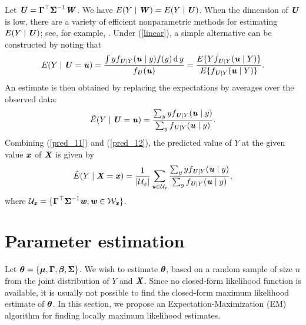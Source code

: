 \documentclass[12pt]{article}
\def \bfitu{\mbox{\textbf{\textit{u}}}}
\def \bfitw{\mbox{\textbf{\textit{w}}}}
\def \bfitx{\mbox{\textbf{\textit{x}}}}
\def \sbfitu{\mbox{\scriptsize\textbf{\textit{u}}}}
\def \sbfitx{\mbox{\scriptsize\textbf{\textit{x}}}}
\def \tbfitx{\mbox{\tiny\textbf{\textit{x}}}}
\def \bfitU{\mbox{\textbf{\textit{U}}}}
\def \sbfitU{\mbox{\scriptsize\textbf{\textit{U}}}}
\def \bfitW{\mbox{\textbf{\textit{W}}}}
\def \sbfitW{\mbox{\scriptsize\textbf{\textit{W}}}}
\def \bfitX{\mbox{\textbf{\textit{X}}}}
\def \bfbeta{\mbox{\boldmath $\beta$}}
\def \bfmu{\mbox{\boldmath $\mu$}}
\def \bftheta{\mbox{\boldmath $\theta$}}
\def \bfGamma{\mbox{\boldmath $\Gamma$}}
\def \bfSigma{\mbox{\boldmath $\Sigma$}}
\def \sbfGamma{\mbox{\scriptsize \boldmath $\Gamma$}}
\begin{document}
Let $\bfitU = \bfGamma^{\top}\bfSigma^{-1} \bfitW$. We have $E(Y \mid \bfitW) = E(Y \mid \bfitU)$. When the dimension of $\bfitU$ is low, there are a variety of efficient nonparametric methods for estimating $E(Y \mid \bfitU)$; see, for example, \citet{hardle1990applied}. Under (\ref{linear}), a simple alternative can be constructed by noting that
\begin{eqnarray*}
E(Y \mid \bfitU = \bfitu) %
= \frac{\int  y f_{\sbfitU \mid Y}(\bfitu \mid y) f(y) \operatorname{d} y}{f_{\sbfitU}(\bfitu)}
= \frac{E\{Y f_{\sbfitU \mid Y}(\bfitu \mid Y)\}}{E\{f_{\sbfitU \mid Y}(\bfitu \mid Y)\}}.
\end{eqnarray*}
An estimate is then obtained by replacing the expectations by averages over the observed data:
\begin{eqnarray}\label{pred_12}
\tilde{E}(Y \mid \bfitU = \bfitu) = \frac{\sum_{y} y f_{\sbfitU \mid Y}(\bfitu \mid y)}{\sum_y f_{\sbfitU \mid Y}(\bfitu \mid y)}.
\end{eqnarray}
Combining (\ref{pred_11}) and (\ref{pred_12}), the predicted value of $Y$ at the given value $\bfitx$ of $\bfitX$ is given by
\begin{eqnarray}\label{pred_1}
\hat{E}(Y \mid \bfitX = \bfitx) = \frac{1}{|\mathcal{U}_{\sbfitx}|}\sum_{\sbfitu \in \mathcal{U}_{\tbfitx}} \frac{\sum_{y} y f_{\sbfitU \mid Y}(\bfitu \mid y)}{\sum_y f_{\sbfitU \mid Y}(\bfitu \mid y)},
\end{eqnarray}
where $\mathcal{U}_{\sbfitx} = \{\bfGamma^{\top}\bfSigma^{-1}\bfitw, \bfitw \in \mathcal{W}_{\sbfitx}\}$.


\section{Parameter estimation}\label{sec_est}

Let $\bftheta = \{\bfmu, \bfGamma, \bfbeta, \bfSigma\}$. We wish to estimate $\bftheta$, based on a random sample of size $n$ from the joint distribution of $Y$ and $\bfitX$. Since no closed-form likelihood function is available, it is usually not possible to find the closed-form maximum likelihood estimate of $\bftheta$. In this section, we propose an Expectation-Maximization (EM) algorithm for finding locally maximum likelihood estimates.
\end{document}
